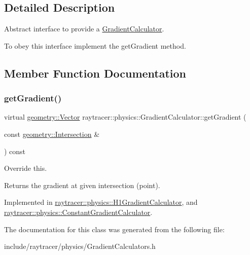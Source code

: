 \subsection{Detailed Description}
Abstract interface to provide a \hyperlink{classraytracer_1_1physics_1_1GradientCalculator}{Gradient\+Calculator}. 

To obey this interface implement the get\+Gradient method. 

\subsection{Member Function Documentation}
\mbox{\label{classraytracer_1_1physics_1_1GradientCalculator_aeca43f861f5a5099a42bd8af1550f3dc}} 
\subsubsection{\texorpdfstring{get\+Gradient()}{getGradient()}}
{\footnotesize\ttfamily virtual \hyperlink{classraytracer_1_1geometry_1_1Vector}{geometry\+::\+Vector} raytracer\+::physics\+::\+Gradient\+Calculator\+::get\+Gradient (\begin{DoxyParamCaption}\item[{const \hyperlink{structraytracer_1_1geometry_1_1Intersection}{geometry\+::\+Intersection} \&}]{ }\end{DoxyParamCaption}) const\hspace{0.3cm}{\ttfamily [pure virtual]}}



Override this. 

\begin{DoxyReturn}{Returns}
the gradient at given intersection (point). 
\end{DoxyReturn}


Implemented in \hyperlink{classraytracer_1_1physics_1_1H1GradientCalculator_ad1a1647e254efdafb87421d007ca6eb1}{raytracer\+::physics\+::\+H1\+Gradient\+Calculator}, and \hyperlink{classraytracer_1_1physics_1_1ConstantGradientCalculator_a62913e68275b1c46893db6fcc74a387f}{raytracer\+::physics\+::\+Constant\+Gradient\+Calculator}.



The documentation for this class was generated from the following file\+:\begin{DoxyCompactItemize}
\item 
include/raytracer/physics/Gradient\+Calculators.\+h\end{DoxyCompactItemize}
